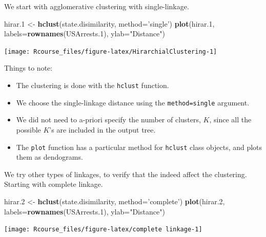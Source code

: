 \documentclass[]{book}
\newenvironment{Shaded}{\begin{snugshade}}{\end{snugshade}}
\newcommand{\KeywordTok}[1]{\textcolor[rgb]{0.13,0.29,0.53}{\textbf{#1}}}
\newcommand{\DataTypeTok}[1]{\textcolor[rgb]{0.13,0.29,0.53}{#1}}
\newcommand{\DecValTok}[1]{\textcolor[rgb]{0.00,0.00,0.81}{#1}}
\newcommand{\StringTok}[1]{\textcolor[rgb]{0.31,0.60,0.02}{#1}}
\newcommand{\NormalTok}[1]{#1}
\providecommand{\tightlist}{%
  \setlength{\itemsep}{0pt}\setlength{\parskip}{0pt}}
\theoremstyle{definition}
\theoremstyle{definition}
\theoremstyle{definition}
\theoremstyle{remark}
\begin{document}
We start with agglomerative clustering with single-linkage.

\begin{Shaded}
\begin{Highlighting}[]
\NormalTok{hirar.}\DecValTok{1}\NormalTok{ <-}\StringTok{ }\KeywordTok{hclust}\NormalTok{(state.disimilarity, }\DataTypeTok{method=}\StringTok{'single'}\NormalTok{)}
\KeywordTok{plot}\NormalTok{(hirar.}\DecValTok{1}\NormalTok{, }\DataTypeTok{labels=}\KeywordTok{rownames}\NormalTok{(USArrests.}\DecValTok{1}\NormalTok{), }\DataTypeTok{ylab=}\StringTok{"Distance"}\NormalTok{)}
\end{Highlighting}
\end{Shaded}

\texttt{[image: Rcourse\_files/figure-latex/HirarchialClustering-1]}

Things to note:

\begin{itemize}
\tightlist
\item
  The clustering is done with the \texttt{hclust} function.
\item
  We choose the single-linkage distance using the
  \texttt{method=\textquotesingle{}single\textquotesingle{}} argument.
\item
  We did not need to a-priori specify the number of clusters, \(K\),
  since all the possible \(K\)'s are included in the output tree.
\item
  The \texttt{plot} function has a particular method for \texttt{hclust}
  class objects, and plots them as dendograms.
\end{itemize}

We try other types of linkages, to verify that the indeed affect the
clustering. Starting with complete linkage.

\begin{Shaded}
\begin{Highlighting}[]
\NormalTok{hirar.}\DecValTok{2}\NormalTok{ <-}\StringTok{ }\KeywordTok{hclust}\NormalTok{(state.disimilarity, }\DataTypeTok{method=}\StringTok{'complete'}\NormalTok{)}
\KeywordTok{plot}\NormalTok{(hirar.}\DecValTok{2}\NormalTok{, }\DataTypeTok{labels=}\KeywordTok{rownames}\NormalTok{(USArrests.}\DecValTok{1}\NormalTok{), }\DataTypeTok{ylab=}\StringTok{"Distance"}\NormalTok{)}
\end{Highlighting}
\end{Shaded}

\texttt{[image: Rcourse\_files/figure-latex/complete linkage-1]}
\end{document}
